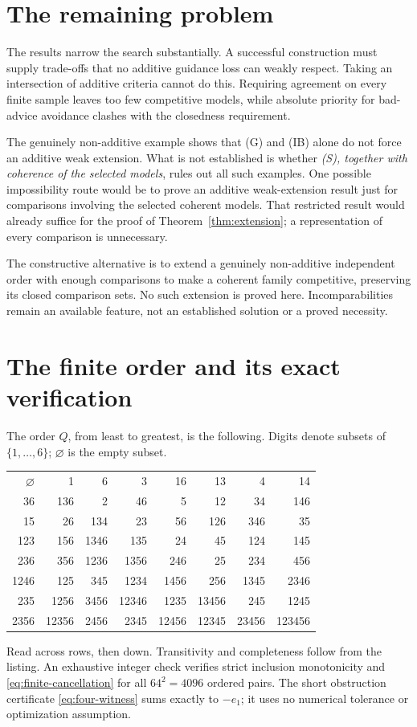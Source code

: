 \documentclass[11pt]{article}
\theoremstyle{remark}\newtheorem{remark}[theorem]{Remark}
\begin{document}
\section{The remaining problem}

The results narrow the search substantially. A successful construction must
supply trade-offs that no additive guidance loss can weakly respect. Taking
an intersection of additive criteria cannot do this. Requiring agreement
on every finite sample leaves too few competitive models, while absolute
priority for bad-advice avoidance clashes with the closedness requirement.

The genuinely non-additive example shows that (G) and (IB) alone do not
force an additive weak extension. What is not established is whether
\emph{(S), together with coherence of the selected models}, rules out all
such examples. One possible impossibility route would be to prove an
additive weak-extension result just for comparisons involving the selected
coherent models. That restricted result would already suffice for the proof
of Theorem~\ref{thm:extension}; a representation of every comparison is
unnecessary.

The constructive alternative is to extend a genuinely non-additive
independent order with enough comparisons to make a coherent family
competitive, preserving its closed comparison sets. No such extension is
proved here. Incomparabilities remain an available feature, not an
established solution or a proved necessity.

\appendix
\section{The finite order and its exact verification}\label{app:finite}

The order $Q$, from least to greatest, is the following. Digits denote subsets
of $\{1,\ldots,6\}$; $\varnothing$ is the empty subset.
\begin{center}\small
\begin{tabular}{rrrrrrrr}
$\varnothing$&1&6&3&16&13&4&14\\
36&136&2&46&5&12&34&146\\
15&26&134&23&56&126&346&35\\
123&156&1346&135&24&45&124&145\\
236&356&1236&1356&246&25&234&456\\
1246&125&345&1234&1456&256&1345&2346\\
235&1256&3456&12346&1235&13456&245&1245\\
2356&12356&2456&2345&12456&12345&23456&123456
\end{tabular}
\end{center}
Read across rows, then down. Transitivity and completeness follow from the
listing. An exhaustive integer check verifies strict inclusion monotonicity
and \eqref{eq:finite-cancellation} for all $64^2=4096$ ordered pairs.
The short obstruction certificate \eqref{eq:four-witness} sums exactly to
$-e_1$; it uses no numerical tolerance or optimization assumption.
\end{document}
